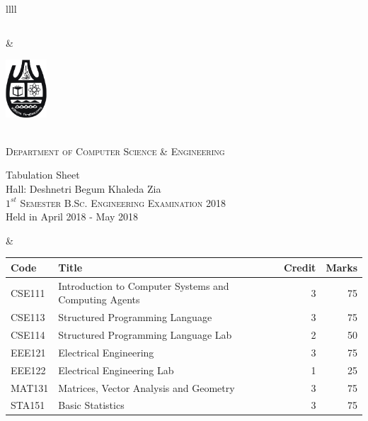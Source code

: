\documentclass[11pt]{article}
\begin{document}
\begin{table}[ht]
\begin{tabularx}{\linewidth}{llll}
\begin{minipage}[m]{0.3\linewidth}
\begin{small}
{\begin{tabular}{ |c|}
			\end{tabular}
		}
	\end{small}
\end{minipage}

&
     \hspace{-5in}
\begin{minipage}[m]{0.35\textwidth} \centering
\includegraphics[width=0.6in]{cu-logo.jpg}
	
	\smallskip
	
	\\
	\textsc{Department of Computer Science \& Engineering}\\
	
	\smallskip
	
	{\large {\sc Tabulation Sheet}}\\
	{\large {\sc Hall: Deshnetri Begum Khaleda Zia}}\\
	
	\smallskip
	\textsc{$1^{st}$ Semester B.Sc. Engineering Examination 2018}\\
	{Held in April 2018 - May 2018}\\
\end{minipage}
&
\hspace{1cm}
\begin{minipage}[m]{0.3\linewidth} \flushright
	\hspace{-5cm}
	\begin{small}
		\renewcommand{\arraystretch}{1.01}
		\begin{tabular} {|l|l|r|r|}
			\hline \hline Code & Title  & Credit &  Marks \\ \hline
\hline  CSE111 & Introduction to Computer Systems and Computing Agents & 3 & 75  \\
\hline  CSE113 & Structured Programming Language & 3 & 75  \\
\hline  CSE114 & Structured Programming Language Lab & 2 & 50  \\
\hline  EEE121 & Electrical Engineering & 3 & 75  \\
\hline  EEE122 & Electrical Engineering Lab & 1 & 25  \\
\hline  MAT131 & Matrices, Vector Analysis and Geometry & 3 & 75  \\
\hline  STA151 & Basic Statistics & 3 & 75  \\
 \hline
		\end{tabular}
	\end{small} 
\end{minipage}


\end{tabularx}
\end{table}
\end{document}
